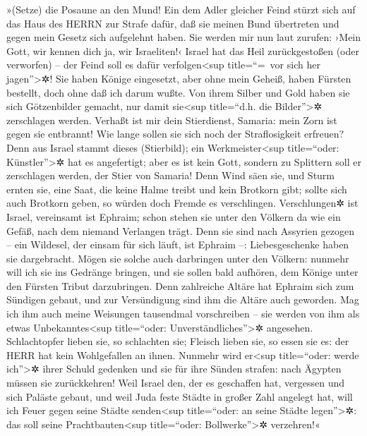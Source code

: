  »(Setze) die Posaune an den Mund! Ein dem Adler gleicher
Feind stürzt sich auf das Haus des HERRN zur Strafe dafür, daß sie
meinen Bund übertreten und gegen mein Gesetz sich aufgelehnt haben.
 Sie werden mir nun laut zurufen: ›Mein Gott, wir kennen
dich ja, wir Israeliten!‹  Israel hat das Heil
zurückgestoßen (oder verworfen) -- der Feind soll es dafür
verfolgen\textless sup title=``=~vor sich her jagen''\textgreater✲!
 Sie haben Könige eingesetzt, aber ohne mein Geheiß, haben
Fürsten bestellt, doch ohne daß ich darum wußte. Von ihrem Silber und
Gold haben sie sich Götzenbilder gemacht, nur damit sie\textless sup
title=``d.h. die Bilder''\textgreater✲ zerschlagen werden.
 Verhaßt ist mir dein Stierdienst, Samaria: mein Zorn ist
gegen sie entbrannt! Wie lange sollen sie sich noch der Straflosigkeit
erfreuen?  Denn aus Israel stammt dieses (Stierbild); ein
Werkmeister\textless sup title=``oder: Künstler''\textgreater✲ hat es
angefertigt; aber es ist kein Gott, sondern zu Splittern soll er
zerschlagen werden, der Stier von Samaria!  Denn Wind säen
sie, und Sturm ernten sie, eine Saat, die keine Halme treibt und kein
Brotkorn gibt; sollte sich auch Brotkorn geben, so würden doch Fremde es
verschlingen.  Verschlungen✲ ist Israel, vereinsamt ist
Ephraim; schon stehen sie unter den Völkern da wie ein Gefäß, nach dem
niemand Verlangen trägt.  Denn sie sind nach Assyrien
gezogen -- ein Wildesel, der einsam für sich läuft, ist Ephraim --:
Liebesgeschenke haben sie dargebracht.  Mögen sie solche
auch darbringen unter den Völkern: nunmehr will ich sie ins Gedränge
bringen, und sie sollen bald aufhören, dem Könige unter den Fürsten
Tribut darzubringen.  Denn zahlreiche Altäre hat Ephraim
sich zum Sündigen gebaut, und zur Versündigung sind ihm die Altäre auch
geworden.  Mag ich ihm auch meine Weisungen tausendmal
vorschreiben -- sie werden von ihm als etwas Unbekanntes\textless sup
title=``oder: Unverständliches''\textgreater✲ angesehen. 
Schlachtopfer lieben sie, so schlachten sie; Fleisch lieben sie, so
essen sie es: der HERR hat kein Wohlgefallen an ihnen. Nunmehr wird
er\textless sup title=``oder: werde ich''\textgreater✲ ihrer Schuld
gedenken und sie für ihre Sünden strafen: nach Ägypten müssen sie
zurückkehren!  Weil Israel den, der es geschaffen hat,
vergessen und sich Paläste gebaut, und weil Juda feste Städte in großer
Zahl angelegt hat, will ich Feuer gegen seine Städte senden\textless sup
title=``oder: an seine Städte legen''\textgreater✲: das soll seine
Prachtbauten\textless sup title=``oder: Bollwerke''\textgreater✲
verzehren!«

